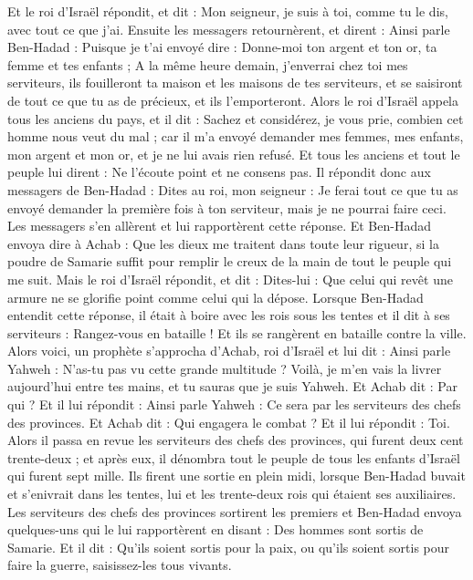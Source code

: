 \begin{multicols}{2}
Et le roi d'Israël répondit, et dit : Mon seigneur, je suis à toi, comme tu le dis, avec tout ce que j'ai.
Ensuite les messagers retournèrent, et dirent : Ainsi parle Ben-Hadad : Puisque je t'ai envoyé dire : Donne-moi ton argent et ton or, ta femme et tes enfants ;
A la même heure demain, j'enverrai chez toi mes serviteurs, ils fouilleront ta maison et les maisons de tes serviteurs, et se saisiront de tout ce que tu as de précieux, et ils l'emporteront.
Alors le roi d'Israël appela tous les anciens du pays, et il dit : Sachez et considérez, je vous prie, combien cet homme nous veut du mal ; car il m’a envoyé demander mes femmes, mes enfants, mon argent et mon or, et je ne lui avais rien refusé.
Et tous les anciens et tout le peuple lui dirent : Ne l'écoute point et ne consens pas.
Il répondit donc aux messagers de Ben-Hadad : Dites au roi, mon seigneur : Je ferai tout ce que tu as envoyé demander la première fois à ton serviteur, mais je ne pourrai faire ceci. Les messagers s'en allèrent et lui rapportèrent cette réponse.
Et Ben-Hadad envoya dire à Achab : Que les dieux me traitent dans toute leur rigueur, si la poudre de Samarie suffit pour remplir le creux de la main de tout le peuple qui me suit.
Mais le roi d'Israël répondit, et dit : Dites-lui : Que celui qui revêt une armure ne se glorifie point comme celui qui la dépose.
Lorsque Ben-Hadad entendit cette réponse, il était à boire avec les rois sous les tentes et il dit à ses serviteurs : Rangez-vous en bataille ! Et ils se rangèrent en bataille contre la ville.
Alors voici, un prophète s’approcha d’Achab, roi d'Israël et lui dit : Ainsi parle Yahweh : N'as-tu pas vu cette grande multitude ? Voilà, je m'en vais la livrer aujourd'hui entre tes mains, et tu sauras que je suis Yahweh.
Et Achab dit : Par qui ? Et il lui répondit : Ainsi parle Yahweh : Ce sera par les serviteurs des chefs des provinces. Et Achab dit : Qui engagera le combat ? Et il lui répondit : Toi.
Alors il passa en revue les serviteurs des chefs des provinces, qui furent deux cent trente-deux ; et après eux, il dénombra tout le peuple de tous les enfants d'Israël qui furent sept mille.
Ils firent une sortie en plein midi, lorsque Ben-Hadad buvait et s'enivrait dans les tentes, lui et les trente-deux rois qui étaient ses auxiliaires.
Les serviteurs des chefs des provinces sortirent les premiers et Ben-Hadad envoya quelques-uns qui le lui rapportèrent en disant : Des hommes sont sortis de Samarie.
Et il dit : Qu’ils soient sortis pour la paix, ou qu'ils soient sortis pour faire la guerre, saisissez-les tous vivants.

\end{multicols}
